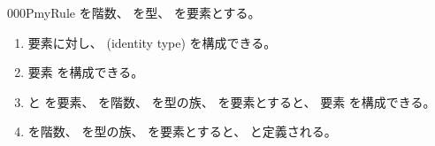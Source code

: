 \documentclass[index]{subfiles}
\begin{document}
\begin{myBlock}{000P}{myRule}
  を階数、
  を型、
  を要素とする。
  \begin{enumerate}
  \item 要素に対し、
    (identity type)
    を構成できる。
  \item 要素
    を構成できる。
  \item {}と
    を要素、
    を階数、
    を型の族、
    を要素とすると、
    要素
    を構成できる。
  \item {}を階数、
    を型の族、
    を要素とすると、
    と定義される。
  \end{enumerate}
\end{myBlock}
\end{document}
